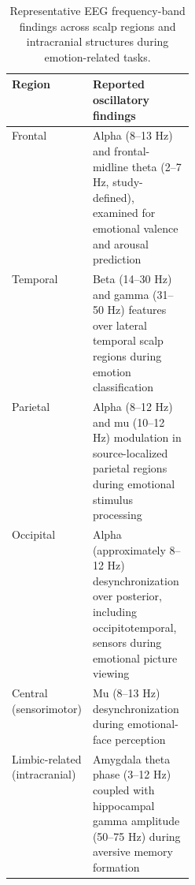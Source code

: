 \documentclass[ASNA,twocolumn]{USG}
\newcommand{\lightrowsep}{%
  \arrayrulecolor{lightrowgray}%
  \specialrule{0.30pt}{3.5pt}{3.5pt}%
  \arrayrulecolor{black}%
}
\begin{document}
\begin{table}[h]
    \centering
    \caption{Representative EEG frequency-band
    findings across scalp regions and intracranial
    structures during emotion-related tasks.}
    \label{tab:brain_eeg_mapping}
    \renewcommand{\arraystretch}{1.18}

    \begin{tabularx}{\linewidth}{
        @{}
        >{\raggedright\arraybackslash}
        p{0.27\linewidth}
        >{\raggedright\arraybackslash}X
        @{}
    }
        \hline
        \textbf{Region} &
        \textbf{Reported oscillatory findings} \\
        \hline

        Frontal &
        Alpha (8--13 Hz) and frontal-midline theta
        (2--7 Hz, study-defined), examined for
        emotional valence and arousal prediction
        \cite{mcfarland2017prediction} \\

        \lightrowsep
        Temporal &
        Beta (14--30 Hz) and gamma (31--50 Hz)
        features over lateral temporal scalp
        regions during emotion classification
        \cite{zheng2015investigating} \\

        \lightrowsep
        Parietal &
        Alpha (8--12 Hz) and mu (10--12 Hz)
        modulation in source-localized
        parietal regions during emotional
        stimulus processing
        \cite{romeo2022comparison} \\

        \lightrowsep
        Occipital &
        Alpha (approximately 8--12 Hz)
        desynchronization over posterior,
        including occipitotemporal, sensors
        during emotional picture viewing
        \cite{codispoti2023alpha} \\

        \lightrowsep
        Central (sensorimotor) &
        Mu (8--13 Hz) desynchronization
        during emotional-face perception
        \cite{moore2012eeg} \\

        \lightrowsep
        Limbic-related
        (intracranial) &
        Amygdala theta phase (3--12 Hz)
        coupled with hippocampal gamma
        amplitude (50--75 Hz) during
        aversive memory formation
        \cite{costa2022aversive} \\

        \hline
    \end{tabularx}
\end{table}
\end{document}
